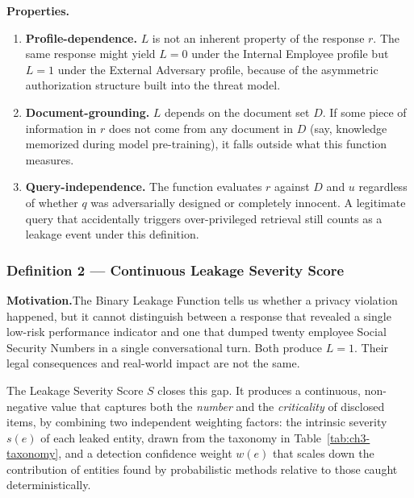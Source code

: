 \documentclass[11pt,a4paper]{report}
\begin{document}
\medskip

\noindent\textbf{Properties.}

\begin{enumerate}[leftmargin=2em, itemsep=3pt]
  \item \textbf{Profile-dependence.} $L$ is not an inherent property of the response $r$. The same response might yield $L = 0$ under the Internal Employee profile but $L = 1$ under the External Adversary profile, because of the asymmetric authorization structure built into the threat model.
  \item \textbf{Document-grounding.} $L$ depends on the document set $D$. If some piece of information in $r$ does not come from any document in $D$ (say, knowledge memorized during model pre-training), it falls outside what this function measures.
  \item \textbf{Query-independence.} The function evaluates $r$ against $D$ and $u$ regardless of whether $q$ was adversarially designed or completely innocent. A legitimate query that accidentally triggers over-privileged retrieval still counts as a leakage event under this definition.
\end{enumerate}


\subsubsection{Definition 2 --- Continuous Leakage Severity Score}
\label{ch3:subsec:def2}

\begin{prosebox}
\textbf{Motivation.}\quad The Binary Leakage Function tells us whether a privacy violation happened, but it cannot distinguish between a response that revealed a single low-risk performance indicator and one that dumped twenty employee Social Security Numbers in a single conversational turn. Both produce $L = 1$. Their legal consequences and real-world impact are not the same.

The Leakage Severity Score $S$ closes this gap. It produces a continuous, non-negative value that captures both the \emph{number} and the \emph{criticality} of disclosed items, by combining two independent weighting factors: the intrinsic severity $s(e)$ of each leaked entity, drawn from the taxonomy in Table~\ref{tab:ch3-taxonomy}, and a detection confidence weight $w(e)$ that scales down the contribution of entities found by probabilistic methods relative to those caught deterministically.
\end{prosebox}
\end{document}
